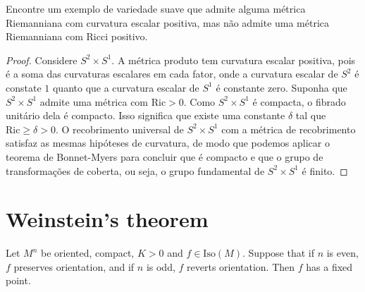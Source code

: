 \begin{exercise}[Exercício 3]
\label{exercise-posit-scala-but-no-posit}
Encontre um exemplo de variedade suave que
admite alguma métrica Riemanniana com
curvatura escalar positiva, mas não admite
uma métrica Riemanniana com Ricci
positivo.
\end{exercise}

\begin{proof}
Considere $S^2\times S^1$. A métrica produto
tem curvatura escalar positiva,
pois é a soma das curvaturas escalares em
cada fator, onde a curvatura escalar
de $S^2$ é constate $1$ quanto que a
curvatura escalar de $S^1$ é constante
zero. Suponha que $S^2\times S^1$ admite uma
métrica com $\text{Ric}>0$. Como
$S^2\times S^1$ é compacta, o fibrado
unitário dela é compacto. Isso significa
que existe uma constante $\delta$ tal que
$\text{Ric}\geq \delta>0$. O
recobrimento universal de $S^2 \times S^1$
com a métrica de
recobrimento satisfaz as mesmas hipóteses de
curvatura, de modo que podemos
aplicar o teorema de Bonnet-Myers para
concluir que é compacto e que o grupo de
transformações de coberta, ou seja, o grupo
fundamental de $S^2\times S^1$ é
finito.
\end{proof}

\section{Weinstein's theorem}
\label{section-Weinstein-theorem}

\begin{theorem}[Weinstein]
\label{theorem-Weinstein}
Let $M^n$ be oriented, compact, $K>0$ and $f
\in \text{Iso}(M)$. Suppose that
if $n$ is even, $f$ preserves orientation,
and if $n$ is odd, $f$ reverts
orientation. Then $f$ has a fixed point.
\end{theorem}


